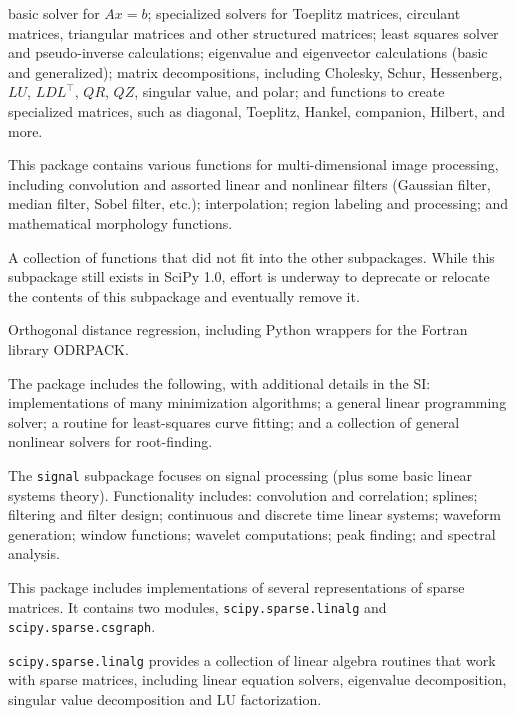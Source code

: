 \begin{description}[leftmargin=!, labelwidth=\widthof{\bfseries \texttt{interpolate}}]
    basic solver for $Ax = b$;
    specialized solvers for Toeplitz matrices, circulant matrices, triangular
    matrices and other structured matrices; least squares solver and
    pseudo-inverse calculations; eigenvalue and eigenvector calculations
    (basic and generalized); matrix decompositions, including Cholesky, Schur,
    Hessenberg, $LU$, $LDL^{\intercal}$, $QR$, $QZ$, singular value, and polar;
    and functions to create specialized matrices, such as diagonal, Toeplitz,
    Hankel, companion, Hilbert, and more.
\item[\texttt{ndimage}]
    This package contains various functions for multi-dimensional image
    processing, including convolution and assorted linear and nonlinear
    filters (Gaussian filter, median filter, Sobel filter, etc.);
    interpolation; region labeling and processing; and mathematical morphology
    functions.
\item[\texttt{misc}]
    A collection of functions that did not fit into the other subpackages.
    While this subpackage still exists in SciPy 1.0, effort is underway
    to deprecate or relocate the contents of this subpackage and eventually remove it.
\item[\texttt{odr}]
    Orthogonal distance regression, including Python wrappers for the Fortran
    library ODRPACK.
\item[\texttt{optimize}]
    The package includes the following, with additional details in the SI:
    implementations of many minimization algorithms; a general linear
    programming solver; a routine for least-squares curve fitting; and a
    collection of general nonlinear solvers for root-finding.
\item[\texttt{signal}]
    The \texttt{signal} subpackage focuses on signal processing (plus some
    basic linear systems theory).  Functionality includes:
    convolution and correlation; splines; filtering and filter design;
    continuous and discrete time linear systems; waveform generation;
    window functions; wavelet computations; peak finding; and spectral
    analysis.  
\item[\texttt{sparse}]
    This package includes implementations of several representations of
    sparse matrices.  It contains two modules, 
    \texttt{scipy.sparse.linalg} and \texttt{scipy.sparse.csgraph}.

    \texttt{scipy.sparse.linalg} provides a collection of linear algebra
    routines that work with sparse matrices, including linear equation
    solvers, eigenvalue decomposition, singular value decomposition
    and LU factorization.


\end{description}
